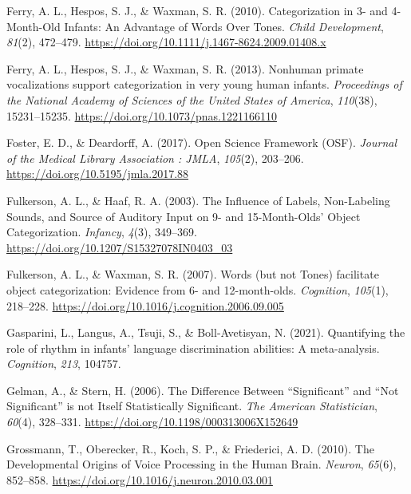 \documentclass[
  man,mask,floatsintext]{apa6}
\newlength{\cslhangindent}
\newlength{\cslentryspacingunit} %
\newenvironment{CSLReferences}[2] %
 {%
  \setlength{\parindent}{0pt}
  \ifodd #1
  \let\oldpar\par
  \def\par{\hangindent=\cslhangindent\oldpar}
  \fi
  \setlength{\parskip}{#2\cslentryspacingunit}
 }%
 {}
\begin{document}
\begin{CSLReferences}{1}{0}
\leavevmode{}%
Ferry, A. L., Hespos, S. J., \& Waxman, S. R. (2010). Categorization in 3- and 4-{Month}-{Old} {Infants}: {An} {Advantage} of {Words} {Over} {Tones}. \emph{Child Development}, \emph{81}(2), 472--479. \url{https://doi.org/10.1111/j.1467-8624.2009.01408.x}

\leavevmode{}%
Ferry, A. L., Hespos, S. J., \& Waxman, S. R. (2013). Nonhuman primate vocalizations support categorization in very young human infants. \emph{Proceedings of the National Academy of Sciences of the United States of America}, \emph{110}(38), 15231--15235. \url{https://doi.org/10.1073/pnas.1221166110}

\leavevmode{}%
Foster, E. D., \& Deardorff, A. (2017). Open {Science} {Framework} ({OSF}). \emph{Journal of the Medical Library Association : JMLA}, \emph{105}(2), 203--206. \url{https://doi.org/10.5195/jmla.2017.88}

\leavevmode{}%
Fulkerson, A. L., \& Haaf, R. A. (2003). The {Influence} of {Labels}, {Non}-{Labeling} {Sounds}, and {Source} of {Auditory} {Input} on 9- and 15-{Month}-{Olds}' {Object} {Categorization}. \emph{Infancy}, \emph{4}(3), 349--369. \url{https://doi.org/10.1207/S15327078IN0403_03}

\leavevmode{}%
Fulkerson, A. L., \& Waxman, S. R. (2007). Words (but not {Tones}) facilitate object categorization: {Evidence} from 6- and 12-month-olds. \emph{Cognition}, \emph{105}(1), 218--228. \url{https://doi.org/10.1016/j.cognition.2006.09.005}

\leavevmode{}%
Gasparini, L., Langus, A., Tsuji, S., \& Boll-Avetisyan, N. (2021). Quantifying the role of rhythm in infants' language discrimination abilities: A meta-analysis. \emph{Cognition}, \emph{213}, 104757.

\leavevmode{}%
Gelman, A., \& Stern, H. (2006). The {Difference} {Between} {``{Significant}''} and {``{Not} {Significant}''} is not {Itself} {Statistically} {Significant}. \emph{The American Statistician}, \emph{60}(4), 328--331. \url{https://doi.org/10.1198/000313006X152649}

\leavevmode{}%
Grossmann, T., Oberecker, R., Koch, S. P., \& Friederici, A. D. (2010). The {Developmental} {Origins} of {Voice} {Processing} in the {Human} {Brain}. \emph{Neuron}, \emph{65}(6), 852--858. \url{https://doi.org/10.1016/j.neuron.2010.03.001}


\end{CSLReferences}
\end{document}
